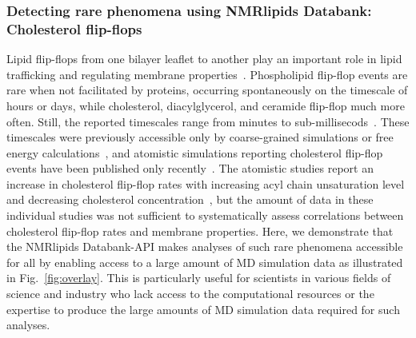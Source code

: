 \documentclass[fleqn,10pt]{wlscirep}
\begin{document}
\subsubsection{Detecting rare phenomena using NMRlipids Databank: Cholesterol flip-flops}
Lipid flip-flops from one bilayer leaflet to another play an important role in lipid trafficking and regulating membrane properties~\cite{vanmeer08}. Phospholipid flip-flop events are rare when not facilitated by proteins, occurring spontaneously on the timescale of hours or days, while cholesterol, diacylglycerol, and ceramide flip-flop much more often. Still, the reported timescales range from minutes to sub-millisecods~\cite{vanmeer08,steck12,parisio16,gu19}. These timescales were previously accessible only by coarse-grained simulations or free energy calculations~\cite{parisio16}, and atomistic simulations reporting cholesterol flip-flop events have been published only recently~\cite{gu19,javanainen19,baral20}. The atomistic studies report an increase in cholesterol flip-flop rates with increasing acyl chain unsaturation level and decreasing cholesterol concentration~\cite{gu19,javanainen19}, but the amount of data in these individual studies was not sufficient to systematically assess correlations between cholesterol flip-flop rates and membrane properties. Here, we demonstrate that the NMRlipids Databank-API makes analyses of such rare phenomena accessible for all by enabling access to a large amount of MD simulation data as illustrated in Fig.~\ref{fig:overlay}. This is particularly useful for scientists in various fields of science and industry who lack access to the computational resources or the expertise to produce the large amounts of MD simulation data required for such analyses. 
\end{document}

